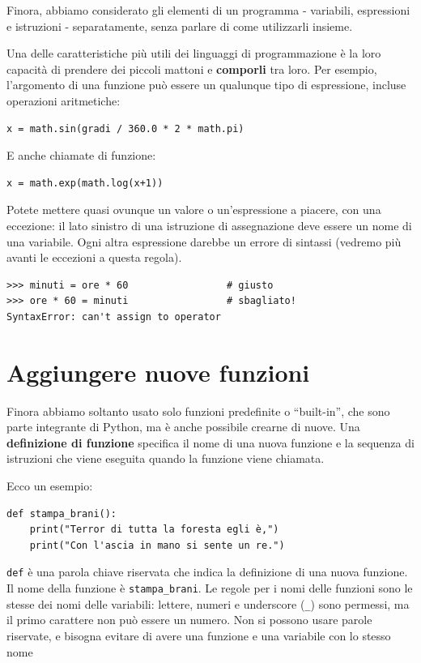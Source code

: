 \documentclass[10pt]{book}
\begin{document}
Finora, abbiamo considerato gli elementi di un programma - variabili, espressioni e istruzioni - separatamente, senza parlare di come utilizzarli insieme.

Una delle caratteristiche più utili dei linguaggi di programmazione è la loro capacità di prendere dei piccoli mattoni e {\bf comporli} tra loro. Per esempio, l'argomento di una funzione può essere un qualunque tipo di espressione, incluse operazioni aritmetiche:

\begin{verbatim}
x = math.sin(gradi / 360.0 * 2 * math.pi)
\end{verbatim}
%
E anche chiamate di funzione:

\begin{verbatim}
x = math.exp(math.log(x+1))
\end{verbatim}
%
Potete mettere quasi ovunque un valore o un'espressione a piacere, con una eccezione: il lato sinistro di una istruzione di assegnazione deve essere un nome di una variabile. Ogni altra espressione darebbe un errore di sintassi (vedremo più avanti le eccezioni a questa regola).

\begin{verbatim}
>>> minuti = ore * 60                 # giusto
>>> ore * 60 = minuti                 # sbagliato!
SyntaxError: can't assign to operator
\end{verbatim}
%


\section{Aggiungere nuove funzioni}

Finora abbiamo soltanto usato solo funzioni predefinite o ``built-in'', che sono parte integrante di Python, ma è anche possibile crearne di nuove.
Una {\bf definizione di funzione} specifica il nome di una nuova funzione e la sequenza di istruzioni che viene eseguita quando la funzione viene chiamata.

Ecco un esempio:

\begin{verbatim}
def stampa_brani():
    print("Terror di tutta la foresta egli è,")
    print("Con l'ascia in mano si sente un re.")
\end{verbatim}
%
{\tt def} è una parola chiave riservata che indica la definizione di una nuova funzione. Il nome della funzione è \verb"stampa_brani".  Le regole per i nomi delle funzioni sono le stesse dei nomi delle variabili: lettere, numeri e underscore (\verb"_") sono permessi, ma il primo carattere non può essere un numero. Non si possono usare parole riservate, e bisogna evitare di avere una funzione e una variabile con lo stesso nome
\end{document}
